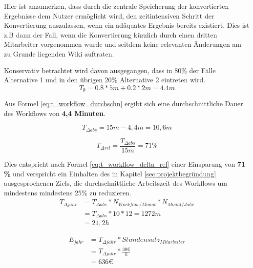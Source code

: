 \documentclass[12pt, xcolor=dvipsnames]{scrartcl}
\begin{document}
Hier ist anzumerken, dass durch die zentrale Speicherung der konvertierten Ergebnisse dem Nutzer ermöglicht wird, den zeitintensiven Schritt der Konvertierung auszulassen, wenn ein adäquates Ergebnis bereits existiert. Dies ist z.B dann der Fall, wenn die Konvertierung kürzlich durch einen dritten Mitarbeiter vorgenommen wurde und seitdem keine relevanten Änderungen am zu Grunde liegenden Wiki auftraten.

Konservativ betrachtet wird davon ausgegangen, dass in 80\% der Fälle Alternative 1 und in den übrigen 20\% Alternative 2 eintreten wird.
\begin{equation} \label{eq:t_workflow_durchschn}
	T_\emptyset = 0.8 * 5m + 0.2* 2m = 4.4m
\end{equation}

Aus Formel \ref{eq:t_workflow_durchschn} ergibt sich eine durchschnittliche Dauer des Workflows von \textbf{4,4 Minuten}.


\begin{equation} \label{eq:t_workflow_delta_abs}
	T_{\Delta abs} = 15m-4,4m = 10,6m
\end{equation}

\begin{equation} \label{eq:t_workflow_delta_rel}
	T_{\Delta rel} = \frac{T_{\Delta abs}}{15m} = 71\%
\end{equation}

Dies entspricht nach Formel \ref{eq:t_workflow_delta_rel} einer Einsparung von \textbf{71 \%} und verspricht ein Einhalten des in Kapitel \ref{sec:projektbegründung} ausgesprochenen Ziels, die durchschnittliche Arbeitszeit des Workflows um mindestens mindestens 25\% zu reduzieren. \\

\begin{equation} \label{eq:t_workflow_delta_jahr}
\begin{split}
	T_{\Delta jahr}	&= T_{\Delta abs} * N_{Workflow/Monat} * N_{Monat/Jahr} \\
					& = T_{\Delta abs} * 10 * 12 = 1272m \\
					& = 21,2h
\end{split}
\end{equation}

\begin{equation} \label{eq:k_workflow_jahr}
\begin{split}
	E_{jahr}	&= T_{\Delta jahr} *  Stundensatz_{Mitarbeiter} \\
				& = T_{\Delta jahr} *  \frac{30 \euro}{h} \\
				& = 636 \euro
\end{split}
\end{equation}
\end{document}
